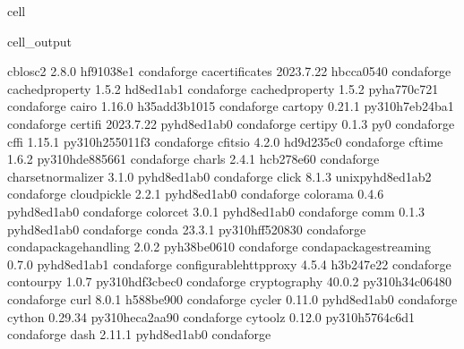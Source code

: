 \documentclass[letterpaper,table,10pt,english]{jupyterBook}
\begin{document}
\begin{sphinxuseclass}{cell}
\begin{sphinxVerbatimOutput}
\begin{sphinxuseclass}{cell_output}
\begin{sphinxVerbatim}[commandchars=\\\{\}]
c\PYGZhy{}blosc2                  2.8.0                hf91038e\PYGZus{}1    conda\PYGZhy{}forge
ca\PYGZhy{}certificates           2023.7.22            hbcca054\PYGZus{}0    conda\PYGZhy{}forge
cached\PYGZhy{}property           1.5.2                hd8ed1ab\PYGZus{}1    conda\PYGZhy{}forge
cached\PYGZus{}property           1.5.2              pyha770c72\PYGZus{}1    conda\PYGZhy{}forge
cairo                     1.16.0            h35add3b\PYGZus{}1015    conda\PYGZhy{}forge
cartopy                   0.21.1          py310h7eb24ba\PYGZus{}1    conda\PYGZhy{}forge
certifi                   2023.7.22          pyhd8ed1ab\PYGZus{}0    conda\PYGZhy{}forge
certipy                   0.1.3                      py\PYGZus{}0    conda\PYGZhy{}forge
cffi                      1.15.1          py310h255011f\PYGZus{}3    conda\PYGZhy{}forge
cfitsio                   4.2.0                hd9d235c\PYGZus{}0    conda\PYGZhy{}forge
cftime                    1.6.2           py310hde88566\PYGZus{}1    conda\PYGZhy{}forge
charls                    2.4.1                hcb278e6\PYGZus{}0    conda\PYGZhy{}forge
charset\PYGZhy{}normalizer        3.1.0              pyhd8ed1ab\PYGZus{}0    conda\PYGZhy{}forge
click                     8.1.3           unix\PYGZus{}pyhd8ed1ab\PYGZus{}2    conda\PYGZhy{}forge
cloudpickle               2.2.1              pyhd8ed1ab\PYGZus{}0    conda\PYGZhy{}forge
colorama                  0.4.6              pyhd8ed1ab\PYGZus{}0    conda\PYGZhy{}forge
colorcet                  3.0.1              pyhd8ed1ab\PYGZus{}0    conda\PYGZhy{}forge
comm                      0.1.3              pyhd8ed1ab\PYGZus{}0    conda\PYGZhy{}forge
conda                     23.3.1          py310hff52083\PYGZus{}0    conda\PYGZhy{}forge
conda\PYGZhy{}package\PYGZhy{}handling    2.0.2              pyh38be061\PYGZus{}0    conda\PYGZhy{}forge
conda\PYGZhy{}package\PYGZhy{}streaming   0.7.0              pyhd8ed1ab\PYGZus{}1    conda\PYGZhy{}forge
configurable\PYGZhy{}http\PYGZhy{}proxy   4.5.4                h3b247e2\PYGZus{}2    conda\PYGZhy{}forge
contourpy                 1.0.7           py310hdf3cbec\PYGZus{}0    conda\PYGZhy{}forge
cryptography              40.0.2          py310h34c0648\PYGZus{}0    conda\PYGZhy{}forge
curl                      8.0.1                h588be90\PYGZus{}0    conda\PYGZhy{}forge
cycler                    0.11.0             pyhd8ed1ab\PYGZus{}0    conda\PYGZhy{}forge
cython                    0.29.34         py310heca2aa9\PYGZus{}0    conda\PYGZhy{}forge
cytoolz                   0.12.0          py310h5764c6d\PYGZus{}1    conda\PYGZhy{}forge
dash                      2.11.1             pyhd8ed1ab\PYGZus{}0    conda\PYGZhy{}forge

\end{sphinxVerbatim}
\end{sphinxuseclass}
\end{sphinxVerbatimOutput}
\end{sphinxuseclass}
\end{document}
